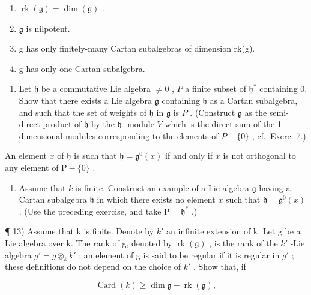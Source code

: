 \begin{enumerate}
\def\labelenumi{(\roman{enumi})}
\item
  \(\operatorname{rk}(\mathfrak{g}) = \dim (\mathfrak{g})\) .
\item
  \(\mathfrak{g}\) is nilpotent.
\item
  g has only finitely-many Cartan subalgebras of dimension rk(g).
\item
  g has only one Cartan subalgebra.
\end{enumerate}

\begin{enumerate}
\def\labelenumi{\arabic{enumi})}
\setcounter{enumi}{10}
\tightlist
\item
  Let \(\mathfrak{h}\) be a commutative Lie algebra \(\neq 0\) , \(P\) a finite subset of \(\mathfrak{h}^*\) containing 0. Show that there exists a Lie algebra \(\mathfrak{g}\) containing \(\mathfrak{h}\) as a Cartan subalgebra, and such that the set of weights of \(\mathfrak{h}\) in \(\mathfrak{g}\) is \(P\) . (Construct \(\mathfrak{g}\) as the semi-direct product of \(\mathfrak{h}\) by the \(\mathfrak{h}\) -module \(V\) which is the direct sum of the 1-dimensional modules corresponding to the elements of \(P - \{0\}\) , cf.~Exerc. 7.)
\end{enumerate}

An element \(x\) of \(\mathfrak{h}\) is such that \(\mathfrak{h} = \mathfrak{g}^0(x)\) if and only if \(x\) is not orthogonal to any element of \(\mathrm{P} - \{0\}\) .

\begin{enumerate}
\def\labelenumi{\arabic{enumi})}
\setcounter{enumi}{11}
\tightlist
\item
  Assume that \(k\) is finite. Construct an example of a Lie algebra \(\mathfrak{g}\) having a Cartan subalgebra \(\mathfrak{h}\) in which there exists no element \(x\) such that \(\mathfrak{h} = \mathfrak{g}^0(x)\) . (Use the preceding exercise, and take \(\mathrm{P} = \mathfrak{h}^*\) .)
\end{enumerate}

¶ 13) Assume that k is finite. Denote by \(k'\) an infinite extension of k. Let g be a Lie algebra over k. The rank of g, denoted by \(\operatorname{rk}(\mathfrak{g})\) , is the rank of the \(k'\) -Lie algebra \(g' = g \otimes_{k} k'\) ; an element of g is said to be regular if it is regular in \(g'\) ; these definitions do not depend on the choice of \(k'\) . Show that, if

\[
\operatorname{Card} (k) \geq \dim \mathfrak {g} - \operatorname{rk} (\mathfrak {g}),
\]

